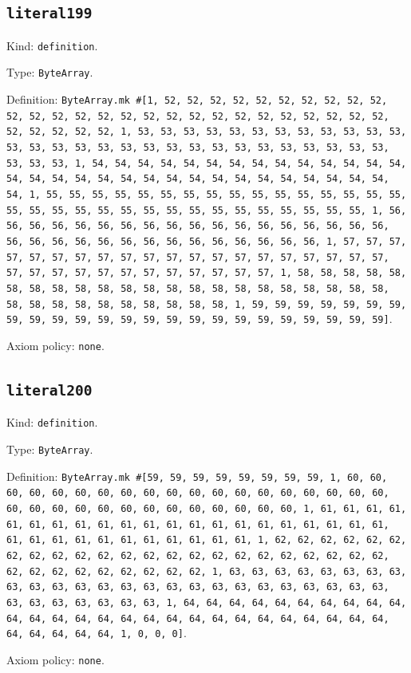 \documentclass[11pt]{article}
\begin{document}
\subsection*{\texttt{literal199}}
\noindent Kind: \texttt{definition}.\par
\noindent Type: \texttt{ByteArray}.\par
\noindent Definition: \texttt{ByteArray.mk \#[1, 52, 52, 52, 52, 52, 52, 52, 52, 52, 52, 52, 52, 52, 52, 52, 52, 52, 52, 52, 52, 52, 52, 52, 52, 52, 52, 52, 52, 52, 52, 52, 52, 1, 53, 53, 53, 53, 53, 53, 53, 53, 53, 53, 53, 53, 53, 53, 53, 53, 53, 53, 53, 53, 53, 53, 53, 53, 53, 53, 53, 53, 53, 53, 53, 53, 1, 54, 54, 54, 54, 54, 54, 54, 54, 54, 54, 54, 54, 54, 54, 54, 54, 54, 54, 54, 54, 54, 54, 54, 54, 54, 54, 54, 54, 54, 54, 54, 54, 1, 55, 55, 55, 55, 55, 55, 55, 55, 55, 55, 55, 55, 55, 55, 55, 55, 55, 55, 55, 55, 55, 55, 55, 55, 55, 55, 55, 55, 55, 55, 55, 55, 1, 56, 56, 56, 56, 56, 56, 56, 56, 56, 56, 56, 56, 56, 56, 56, 56, 56, 56, 56, 56, 56, 56, 56, 56, 56, 56, 56, 56, 56, 56, 56, 56, 1, 57, 57, 57, 57, 57, 57, 57, 57, 57, 57, 57, 57, 57, 57, 57, 57, 57, 57, 57, 57, 57, 57, 57, 57, 57, 57, 57, 57, 57, 57, 57, 57, 1, 58, 58, 58, 58, 58, 58, 58, 58, 58, 58, 58, 58, 58, 58, 58, 58, 58, 58, 58, 58, 58, 58, 58, 58, 58, 58, 58, 58, 58, 58, 58, 58, 1, 59, 59, 59, 59, 59, 59, 59, 59, 59, 59, 59, 59, 59, 59, 59, 59, 59, 59, 59, 59, 59, 59, 59, 59]}.\par
\noindent Axiom policy: \texttt{none}.\par
\subsection*{\texttt{literal200}}
\noindent Kind: \texttt{definition}.\par
\noindent Type: \texttt{ByteArray}.\par
\noindent Definition: \texttt{ByteArray.mk \#[59, 59, 59, 59, 59, 59, 59, 59, 1, 60, 60, 60, 60, 60, 60, 60, 60, 60, 60, 60, 60, 60, 60, 60, 60, 60, 60, 60, 60, 60, 60, 60, 60, 60, 60, 60, 60, 60, 60, 60, 60, 1, 61, 61, 61, 61, 61, 61, 61, 61, 61, 61, 61, 61, 61, 61, 61, 61, 61, 61, 61, 61, 61, 61, 61, 61, 61, 61, 61, 61, 61, 61, 61, 61, 1, 62, 62, 62, 62, 62, 62, 62, 62, 62, 62, 62, 62, 62, 62, 62, 62, 62, 62, 62, 62, 62, 62, 62, 62, 62, 62, 62, 62, 62, 62, 62, 62, 1, 63, 63, 63, 63, 63, 63, 63, 63, 63, 63, 63, 63, 63, 63, 63, 63, 63, 63, 63, 63, 63, 63, 63, 63, 63, 63, 63, 63, 63, 63, 63, 63, 1, 64, 64, 64, 64, 64, 64, 64, 64, 64, 64, 64, 64, 64, 64, 64, 64, 64, 64, 64, 64, 64, 64, 64, 64, 64, 64, 64, 64, 64, 64, 64, 64, 1, 0, 0, 0]}.\par
\noindent Axiom policy: \texttt{none}.\par
\end{document}
